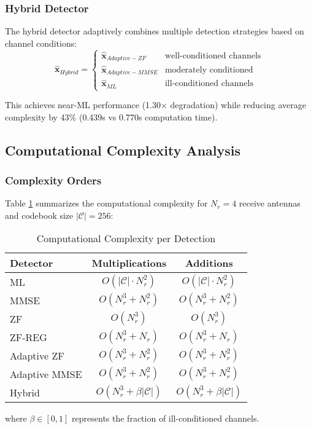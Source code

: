 \subsubsection{Hybrid Detector}
The hybrid detector adaptively combines multiple detection strategies based on channel conditions:
\begin{equation}
\hat{\mathbf{x}}_{Hybrid} = \begin{cases}
\hat{\mathbf{x}}_{Adaptive-ZF} & \text{well-conditioned channels} \\
\hat{\mathbf{x}}_{Adaptive-MMSE} & \text{moderately conditioned} \\
\hat{\mathbf{x}}_{ML} & \text{ill-conditioned channels}
\end{cases}
\end{equation}

This achieves near-ML performance (1.30× degradation) while reducing average complexity by 43\% (0.439s vs 0.770s computation time).

\subsection{Computational Complexity Analysis}

\subsubsection{Complexity Orders}
Table \ref{tab:complexity} summarizes the computational complexity for $N_r = 4$ receive antennas and codebook size $|\mathcal{C}| = 256$:

\begin{table}[h]
\caption{Computational Complexity per Detection}
\label{tab:complexity}
\centering
\begin{tabular}{|l|c|c|}
\hline
\textbf{Detector} & \textbf{Multiplications} & \textbf{Additions} \\
\hline
ML & $O(|\mathcal{C}| \cdot N_r^2)$ & $O(|\mathcal{C}| \cdot N_r^2)$ \\
MMSE & $O(N_r^3 + N_r^2)$ & $O(N_r^3 + N_r^2)$ \\
ZF & $O(N_r^3)$ & $O(N_r^3)$ \\
ZF-REG & $O(N_r^3 + N_r)$ & $O(N_r^3 + N_r)$ \\
Adaptive ZF & $O(N_r^3 + N_r^2)$ & $O(N_r^3 + N_r^2)$ \\
Adaptive MMSE & $O(N_r^3 + N_r^2)$ & $O(N_r^3 + N_r^2)$ \\
Hybrid & $O(N_r^3 + \beta|\mathcal{C}|)$ & $O(N_r^3 + \beta|\mathcal{C}|)$ \\
\hline
\end{tabular}
\end{table}
where $\beta \in [0,1]$ represents the fraction of ill-conditioned channels.

